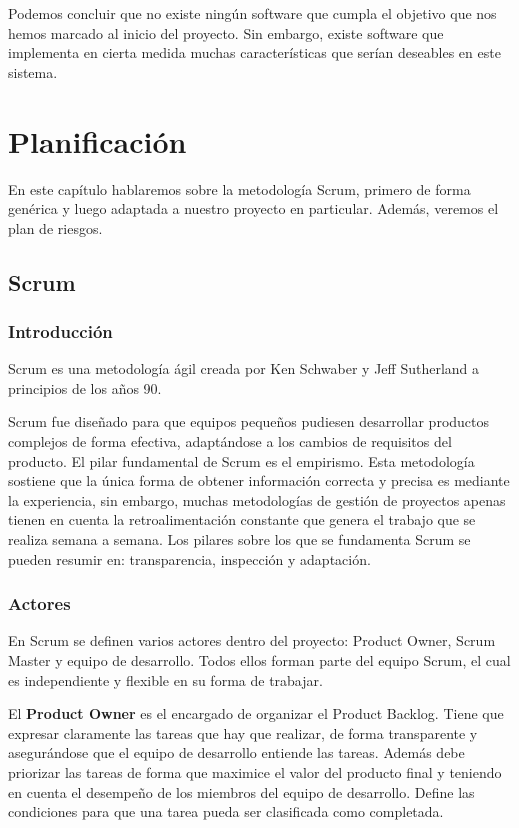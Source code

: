 \documentclass[12pt]{report} %
\begin{document}
Podemos concluir que no existe ningún software que cumpla el objetivo que nos hemos marcado al inicio del proyecto. Sin embargo, existe software que implementa en cierta medida muchas características que serían deseables en este sistema.

\chapter{Planificación}

En este capítulo hablaremos sobre la metodología Scrum, primero de forma genérica y luego adaptada a nuestro proyecto en particular. Además, veremos el plan de riesgos.
\section{Scrum}

\subsection{Introducción}
Scrum es una metodología ágil creada por Ken Schwaber y Jeff Sutherland a principios de los años 90.\cite{scrum}

Scrum fue diseñado para que equipos pequeños pudiesen desarrollar productos complejos de forma efectiva, adaptándose a los cambios de requisitos del producto.
El pilar fundamental de Scrum es el empirismo. Esta metodología sostiene que la única forma de obtener información correcta y precisa es mediante la experiencia, sin embargo, muchas metodologías de gestión de proyectos apenas tienen en cuenta la retroalimentación constante que genera el trabajo que se realiza semana a semana. Los pilares sobre los que se fundamenta Scrum se pueden resumir en: transparencia, inspección y adaptación.

\subsection{Actores}
En Scrum se definen varios actores dentro del proyecto: Product Owner, Scrum Master y equipo de desarrollo. Todos ellos forman parte del equipo Scrum, el cual es independiente y flexible en su forma de trabajar.

El \textbf{Product Owner} es el encargado de organizar el Product Backlog. Tiene que expresar claramente las tareas que hay que realizar, de forma transparente y asegurándose que el equipo de desarrollo entiende las tareas. Además debe priorizar las tareas de forma que maximice el valor del producto final y teniendo en cuenta el desempeño de los miembros del equipo de desarrollo. Define las condiciones para que una tarea pueda ser clasificada como completada.
\end{document}

